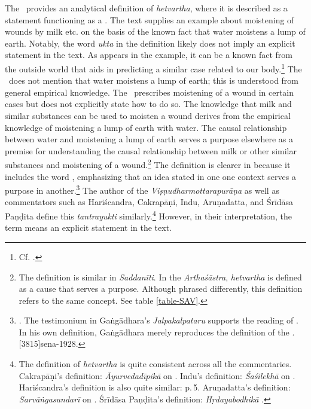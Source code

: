 The \SS\ provides an analytical definition of \emph{hetvartha}, 
where it is described as a statement functioning as a . 
The text supplies an example about moistening of wounds by milk etc. 
on the basis of the known fact that water moistens a lump of earth. 
Notably, the word \emph{ukta} in the definition 
likely does not imply an explicit statement in the text. 
As appears in the example, it can be a known fact from the outside world 
that aids in predicting a similar case related to our body.\footnote{%
	Cf.  
	.} 
The \SS\ does not mention that water moistens a lump of earth; 
this is understood from general empirical knowledge. 
The \SS\ prescribes moistening of a wound in certain cases 
but does not explicitly state how to do so. 
The knowledge that milk and similar substances 
can be used to moisten a wound derives 
from the empirical knowledge of moistening a lump of earth with water. 
The causal relationship between water and moistening a lump of earth 
serves a purpose elsewhere as a premise 
for understanding the causal relationship 
between milk or other similar substances 
and moistening of a wound.\footnote{%
	The definition is similar in \emph{Saddanīti}. 
	In the \emph{Arthaśāstra}, \emph{hetvartha} is defined 
	as a cause that serves a purpose. 
	Although phrased differently, 
	this definition refers to the same concept. 
	See table \ref{table-SAV}.} 
The definition is clearer in  
because it includes the word , 
emphasizing that an idea stated in one one context 
serves a purpose in another.\footnote{	.
		The testimonium in Gaṅgādhara's \emph{Jalpakalpataru} 
		supports the reading of \Su{}{}. 
		In his own definition, Gaṅgādhara merely reproduces the definition of the 
\SS. 
		{sena-1928}.} 
The author of the \emph{Viṣṇudharmottarapurāṇa} as well as 
commentators such as Hariścandra, Cakrapāṇi, Indu, Aruṇadatta, and Śrīdāsa 
Paṇḍita 
define this \emph{tantrayukti} similarly.\footnote{%
	The definition of \emph{hetvartha} is quite consistent
	across all the commentaries.
	Cakrapāṇi's definition:  
		\emph{Āyurvedadīpikā} on .
	Indu's definition: 
		\emph{Śaśilekhā} on .
	Hariścandra's definition is also quite similar: 
		  p.\,5.
	Aruṇadatta's definition: 
		\emph{Sarvāṅgasundarī} on .
	Śrīdāsa Paṇḍita's definition: 
		\emph{Hṛdayabodhikā} \parencite[2]{muss-1940}.
		} 
However, in their interpretation, the term  
means an explicit statement in the text. 

